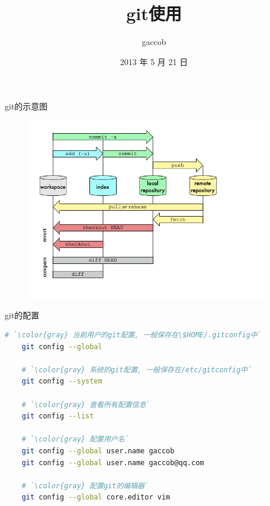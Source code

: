 
\title {\ZHH \huge git使用}
\author {\small gaccob}
\date {\small 2013 年 5 月 21 日}
\maketitle

{\ZHH git的示意图}\par
\begin{figure}[htbp]
    \centering
    \includegraphics[width=300pt, keepaspectratio]{git.png}
\end{figure}
\vspace{10pt}


{\ZHH git的配置}\par
\begin{lstlisting}[language=bash]
    # `\color{gray} 当前用户的git配置, 一般保存在\$HOME/.gitconfig中`
    git config --global

    # `\color{gray} 系统的git配置, 一般保存在/etc/gitconfig中`
    git config --system

    # `\color{gray} 查看所有配置信息`
    git config --list

    # `\color{gray} 配置用户名`
    git config --global user.name gaccob
    git config --global user.name gaccob@qq.com

    # `\color{gray} 配置git的编辑器`
    git config --global core.editor vim
\end{lstlisting} \par
\vspace{10pt}


